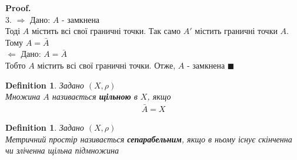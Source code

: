 \documentclass[a4paper, 14pt]{extarticle}
\def\rightproof{$\boxed{\Rightarrow}$ }
\def\leftproof{$\boxed{\Leftarrow}$ }
\theoremstyle{theoremdd}
\theoremstyle{theoremdd}
\newtheorem{definition}[theorem]{Definition}
\theoremstyle{theoremdd}
\theoremstyle{theoremdd}
\theoremstyle{theoremdd}
\theoremstyle{theoremdd}
\theoremstyle{theoremdd}
\theoremstyle{theoremdd}
\newenvironment{pf}{\vspace*{-3mm} \textbf{Proof. \\}}{$\blacksquare$}
\begin{document}
\begin{pf}
3. \rightproof Дано: $A$ - замкнена\\
Тоді $A$ містить всі свої граничні точки. Так само $A'$ містить граничні точки $A$. Тому $A = \bar{A}$\\
\leftproof Дано: $A = \bar{A}$\\
Тобто $A$ містить всі свої граничні точки. Отже, $A$ - замкнена
\end{pf}

\begin{definition} Задано $(X, \rho)$\\
Множина $A$ називається \textbf{щільною} в $X$, якщо
\begin{align*}
\bar{A} = X
\end{align*}
\end{definition}

\begin{definition}
Задано $(X, \rho)$\\
Метричний простір називається \textbf{сепарабельним}, якщо в ньому існує скінченна чи зліченна щільна підмножина
\end{definition}
\end{document}
